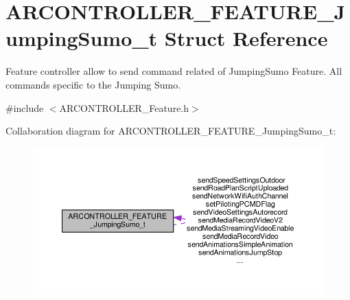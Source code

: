 \hypertarget{struct_a_r_c_o_n_t_r_o_l_l_e_r___f_e_a_t_u_r_e___jumping_sumo__t}{}\section{A\+R\+C\+O\+N\+T\+R\+O\+L\+L\+E\+R\+\_\+\+F\+E\+A\+T\+U\+R\+E\+\_\+\+Jumping\+Sumo\+\_\+t Struct Reference}
\label{struct_a_r_c_o_n_t_r_o_l_l_e_r___f_e_a_t_u_r_e___jumping_sumo__t}


Feature controller allow to send command related of Jumping\+Sumo Feature. All commands specific to the Jumping Sumo.  




{\ttfamily \#include $<$A\+R\+C\+O\+N\+T\+R\+O\+L\+L\+E\+R\+\_\+\+Feature.\+h$>$}



Collaboration diagram for A\+R\+C\+O\+N\+T\+R\+O\+L\+L\+E\+R\+\_\+\+F\+E\+A\+T\+U\+R\+E\+\_\+\+Jumping\+Sumo\+\_\+t\+:
\nopagebreak
\begin{figure}[H]
\begin{center}
\leavevmode
\includegraphics[width=350pt]{struct_a_r_c_o_n_t_r_o_l_l_e_r___f_e_a_t_u_r_e___jumping_sumo__t__coll__graph}
\end{center}
\end{figure}
